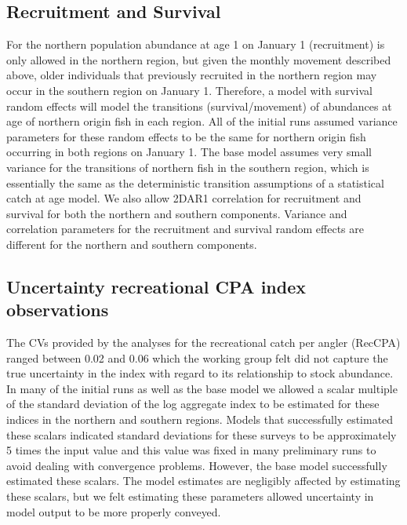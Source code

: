 \documentclass[
]{article}
\begin{document}
\hypertarget{recruitment-and-survival}{%
\subsection{Recruitment and Survival}\label{recruitment-and-survival}}

For the northern population abundance at age 1 on January 1 (recruitment) is only allowed in the northern region, but given the monthly movement described above, older individuals that previously recruited in the northern region may occur in the southern region on January 1. Therefore, a model with survival random effects will model the transitions (survival/movement) of abundances at age of northern origin fish in each region. All of the initial runs assumed variance parameters for these random effects to be the same for northern origin fish occurring in both regions on January 1. The base model assumes very small variance for the transitions of northern fish in the southern region, which is essentially the same as the deterministic transition assumptions of a statistical catch at age model. We also allow 2DAR1 correlation for recruitment and survival for both the northern and southern components. Variance and correlation parameters for the recruitment and survival random effects are different for the northern and southern components.

\hypertarget{uncertainty-recreational-cpa-index-observations}{%
\subsection{Uncertainty recreational CPA index observations}\label{uncertainty-recreational-cpa-index-observations}}

The CVs provided by the analyses for the recreational catch per angler (RecCPA) ranged between 0.02 and 0.06 which the working group felt did not capture the true uncertainty in the index with regard to its relationship to stock abundance. In many of the initial runs as well as the base model we allowed a scalar multiple of the standard deviation of the log aggregate index to be estimated for these indices in the northern and southern regions. Models that successfully estimated these scalars indicated standard deviations for these surveys to be approximately 5 times the input value and this value was fixed in many preliminary runs to avoid dealing with convergence problems. However, the base model successfully estimated these scalars. The model estimates are negligibly affected by estimating these scalars, but we felt estimating these parameters allowed uncertainty in model output to be more properly conveyed.
\end{document}
